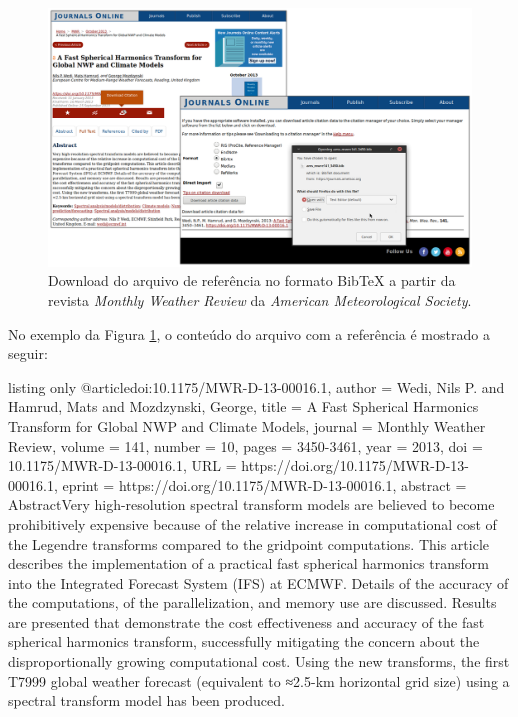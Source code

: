 \begin{figure}[H]
    \centering
    \includegraphics[scale=0.4]{./figs/exemplo_revista_ams_citacao.png}
    \caption{Download do arquivo de referência no formato BibTeX a partir da revista \textit{Monthly Weather Review} da \textit{American Meteorological Society}.}
    \label{fig:exemplo_revista_ams_citacao}
\end{figure}

No exemplo da Figura \ref{fig:exemplo_revista_ams_citacao}, o conteúdo do arquivo com a referência é mostrado a seguir:

\begin{texexp}{listing only}
@article{doi:10.1175/MWR-D-13-00016.1,
author   = {Wedi, Nils P. and Hamrud, Mats and Mozdzynski, George},
title    = {A Fast Spherical Harmonics Transform for Global NWP and Climate Models},
journal  = {Monthly Weather Review},
volume   = {141},
number   = {10},
pages    = {3450-3461},
year     = {2013},
doi      = {10.1175/MWR-D-13-00016.1},
URL      = {https://doi.org/10.1175/MWR-D-13-00016.1},
eprint   = {https://doi.org/10.1175/MWR-D-13-00016.1},
abstract = { AbstractVery high-resolution spectral transform models are believed to become prohibitively expensive because of the relative increase in computational cost of the Legendre transforms compared to the gridpoint computations. This article describes the implementation of a practical fast spherical harmonics transform into the Integrated Forecast System (IFS) at ECMWF. Details of the accuracy of the computations, of the parallelization, and memory use are discussed. Results are presented that demonstrate the cost effectiveness and accuracy of the fast spherical harmonics transform, successfully mitigating the concern about the disproportionally growing computational cost. Using the new transforms, the first T7999 global weather forecast (equivalent to ≈2.5-km horizontal grid size) using a spectral transform model has been produced.}
}
\end{texexp}

